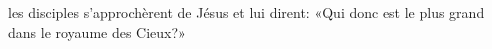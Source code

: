 \encetemps les disciples s’approchèrent de Jésus et lui dirent:
	«Qui donc est le plus grand dans le royaume des Cieux?»
